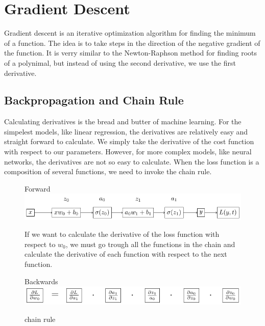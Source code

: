 \documentclass[twoside,11pt]{report}
\begin{document}
\section{Gradient Descent}
\label{sec:GD}

Gradient descent is an iterative optimization algorithm for finding the minimum of a function.
The idea is to take steps in the direction of the negative gradient of the function. It is
verry similar to the Newton-Raphson method for finding roots of a polynimal,
but instead of using the second derivative, we use the first derivative.


\subsection{Backpropagation and Chain Rule}
\label{sec:backpropagation}

Calculating derivatives is the bread and butter of machine learning. For the simpelest models, like linear regression,
the derivatives are relatively easy and straight forward to calculate. We simply take the derivative of the cost function
with respect to our parameters. However, for more complex models, like neural networks, the derivatives 
are not so easy to calculate.
When the loss function is a composition of several functions, we need to invoke the chain rule. 

\begin{figure}[!h]
    \begin{center}
        Forward\\
        \includegraphics[width=\textwidth]{tikzfigures/forward.pdf}\\
    \end{center}
    If we want to calculate the derivative of the loss function with respect to $w_0$,
    we must go trough all the functions in the chain and calculate the derivative of 
    each function with respect to the next function.
    \begin{center}
        Backwards\\
        \hspace{1cm}
        \includegraphics[width=\textwidth]{tikzfigures/backwards.pdf}
    \end{center}
    \caption{chain rule}\label{fig:chainrule}
\end{figure}
\end{document}
